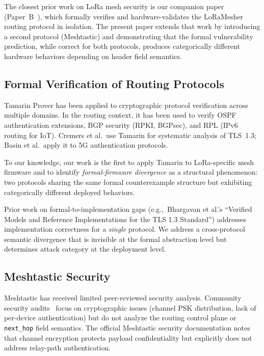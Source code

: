 \documentclass[journal]{IEEEtran}
\begin{document}
The closest prior work on LoRa mesh security is our companion paper
(Paper~B~\cite{paperb}), which formally verifies and hardware-validates the
LoRaMesher routing protocol in isolation. The present paper extends that work
by introducing a second protocol (Meshtastic) and demonstrating that the formal
vulnerability prediction, while correct for both protocols, produces
categorically different hardware behaviors depending on header field semantics.

\subsection{Formal Verification of Routing Protocols}

Tamarin Prover has been applied to cryptographic protocol verification across
multiple domains. In the routing context, it has been used to verify OSPF
authentication extensions, BGP security (RPKI, BGPsec), and RPL (IPv6 routing
for IoT). Cremers et al.\ use Tamarin for systematic analysis of TLS~1.3;
Basin et al.\ apply it to 5G authentication protocols.

To our knowledge, our work is the first to apply Tamarin to LoRa-specific mesh
firmware and to identify \emph{formal-firmware divergence} as a structural
phenomenon: two protocols sharing the same formal counterexample structure
but exhibiting categorically different deployed behaviors.

Prior work on formal-to-implementation gaps (e.g.,\ Bhargavan et al.'s
``Verified Models and Reference Implementations for the TLS 1.3
Standard'') addresses implementation correctness for a \emph{single}
protocol. We address a cross-protocol semantic divergence that is invisible
at the formal abstraction level but determines attack category at the
deployment level.

\subsection{Meshtastic Security}

Meshtastic has received limited peer-reviewed security analysis. Community
security audits~\cite{meshtastic-audit} focus on cryptographic issues
(channel PSK distribution, lack of per-device authentication) but do not
analyze the routing control plane or \texttt{next\_hop} field semantics.
The official Meshtastic security documentation notes that channel encryption
protects payload confidentiality but explicitly does not address relay-path
authentication.
\end{document}
